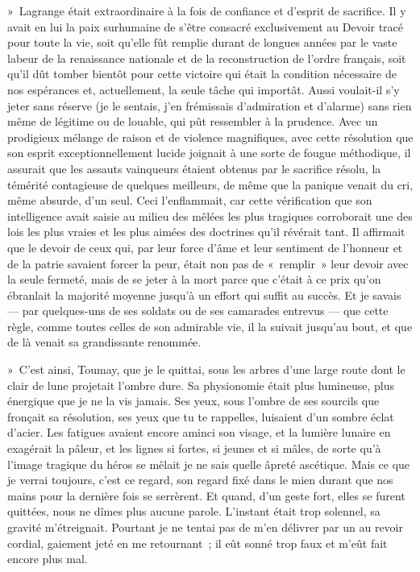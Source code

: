 \documentclass[french,twoside]{book} %
\begin{document}
» Lagrange était extraordinaire à la fois de confiance et d’esprit de sacrifice. Il y avait en lui la paix surhumaine de s’être consacré exclusivement au Devoir tracé pour toute la vie, soit qu’elle fût remplie durant de longues années par le vaste labeur de la renaissance nationale et de la reconstruction de l’ordre français, soit qu’il dût tomber bientôt pour cette victoire qui était la condition nécessaire de nos espérances et, actuellement, la seule tâche qui importât. Aussi voulait-il s’y jeter sans réserve (je le sentais, j’en frémissais d’admiration et d’alarme) sans rien même de légitime ou de louable, qui pût ressembler à la prudence. Avec un prodigieux mélange de raison et de violence magnifiques, avec cette résolution que son esprit exceptionnellement lucide joignait à une sorte de fougue méthodique, il assurait que les assauts vainqueurs étaient obtenus par le sacrifice résolu, la témérité contagieuse de quelques meilleurs, de même que la panique venait du cri, même absurde, d’un seul. Ceci l’enflammait, car cette vérification que son intelligence avait saisie au milieu des mêlées les plus tragiques corroborait une des lois les plus vraies et les plus aimées des doctrines qu’il révérait tant. Il affirmait que le devoir de ceux qui, par leur force d’âme et leur sentiment de l’honneur et de la patrie savaient forcer la peur, était non pas de « remplir » leur devoir avec la seule fermeté, mais de se jeter à la mort parce que c’était à ce prix qu’on ébranlait la majorité moyenne jusqu’à un effort qui suffit au succès. Et je savais — par quelques-uns de ses soldats ou de ses camarades entrevus — que cette règle, comme toutes celles de son admirable vie, il la suivait jusqu’au bout, et que de là venait sa grandissante renommée.‌\par
» C’est ainsi, Toumay, que je le quittai, sous les arbres d’une large route dont le clair de lune projetait l’ombre dure. Sa physionomie était plus lumineuse, plus énergique que je ne la vis jamais. Ses yeux, sous l’ombre de ses sourcils que fronçait sa résolution, ses yeux que tu te rappelles, luisaient d’un sombre éclat d’acier. Les fatigues avaient encore aminci son visage, et la lumière lunaire en exagérait la pâleur, et les lignes si fortes, si jeunes et si mâles, de sorte qu’à l’image tragique du héros se mêlait je ne sais quelle âpreté ascétique. Mais ce que je verrai toujours, c’est ce regard, son regard fixé dans le mien durant que nos mains pour la dernière fois se serrèrent. Et quand, d’un geste fort, elles se furent quittées, nous ne dîmes plus aucune parole. L’instant était trop solennel, sa gravité m’étreignait. Pourtant je ne tentai pas de m’en délivrer par un au revoir cordial, gaiement jeté en me retournant ; il eût sonné trop faux et m’eût fait encore plus mal.‌\par
\end{document}
